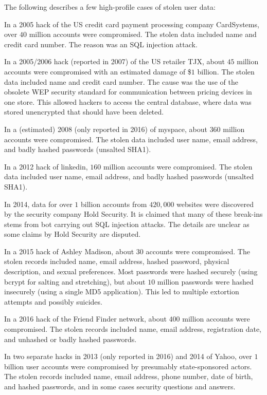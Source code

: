 The following describes a few high-profile cases of stolen user data:
\begin{compactitem}
\item In a 2005 hack of the US credit card payment processing company CardSystems, over $40$ million accounts were compromised.
The stolen data included name and credit card number.
The reason was an SQL injection attack.

\item In a 2005/2006 hack (reported in 2007) of the US retailer TJX, about $45$ million accounts were compromised with an estimated damage of \$$1$ billion.
The stolen data included name and credit card number.
The cause was the use of the obsolete WEP security standard for communication between pricing devices in one store.
This allowed hackers to access the central database, where data was stored unencrypted that should have been deleted.

\item In a (estimated) 2008 (only reported in 2016) of myspace, about $360$ million accounts were compromised.
The stolen data included user name, email address, and badly hashed passwords (unsalted SHA1).

\item In a 2012 hack of linkedin, $160$ million accounts were compromised.
The stolen data included user name, email address, and badly hashed passwords (unsalted SHA1).

\item In 2014, data for over $1$ billion accounts from $420,000$ websites were discovered by the security company Hold Security.
It is claimed that many of these break-ins stems from bot carrying out SQL injection attacks.
The details are unclear as some claims by Hold Security are disputed.

\item In a 2015 hack of Ashley Madison, about $30$ accounts were compromised.
The stolen records included name, email address, hashed password, physical description, and sexual preferences.
Most passwords were hashed securely (using bcrypt for salting and stretching), but about $10$ million passwords were hashed insecurely (using a single MD5 application).
This led to multiple extortion attempts and possibly suicides.

\item In a 2016 hack of the Friend Finder network, about $400$ million accounts were compromised.
The stolen records included name, email address, registration date, and unhashed or badly hashed passwords.

\item In two separate hacks in 2013 (only reported in 2016) and 2014 of Yahoo, over $1$ billion user accounts were compromised by presumably state-sponsored actors.
The stolen records included name, email address, phone number, date of birth, and hashed passwords, and in some cases security questions and answers.
\end{compactitem}

